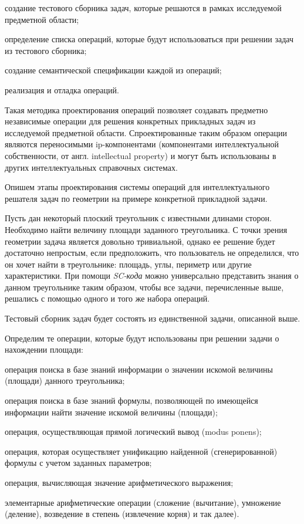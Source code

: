 \begin{textitemize}
	\item создание тестового сборника задач, которые решаются в рамках исследуемой предметной области;
	\item определение списка операций, которые будут использоваться при решении задач из тестового сборника;
	\item создание семантической спецификации каждой из операций;
	\item реализация и отладка операций.
\end{textitemize}

Такая методика проектирования операций позволяет создавать предметно независимые операции для решения конкретных прикладных задач из исследуемой предметной области. Спроектированные таким образом операции являются переносимыми ip-компонентами (компонентами интеллектуальной собственности, от англ. intellectual property) и могут быть использованы в других интеллектуальных справочных системах.

Опишем этапы проектирования системы операций для интеллектуального решателя задач по геометрии на примере конкретной прикладной задачи.

Пусть дан некоторый плоский треугольник с известными длинами сторон. Необходимо найти величину площади заданного треугольника. С точки зрения геометрии задача является довольно тривиальной, однако ее решение будет достаточно непростым, если предположить, что пользователь не определился, что он хочет найти в треугольнике: площадь, углы, периметр или другие характеристики. При помощи \textit{SC-кода} можно универсально представить знания о данном треугольнике таким образом, чтобы все задачи, перечисленные выше, решались с помощью одного и того же набора операций.

Тестовый сборник задач будет состоять из единственной задачи, описанной выше.

Определим те операции, которые будут использованы при решении задачи о нахождении площади:

\begin{textitemize}
	\item операция поиска в базе знаний информации о значении искомой величины (площади) данного треугольника;
	\item операция поиска в базе знаний формулы, позволяющей по имеющейся информации найти значение искомой величины (площади);
	\item операция, осуществляющая прямой логический вывод (modus ponens);
	\item операция, которая осуществляет унификацию найденной (сгенерированной) формулы с учетом заданных параметров;
	\item операция, вычисляющая значение арифметического выражения;
	\item элементарные арифметические операции (сложение (вычитание), умножение (деление), возведение в степень (извлечение корня) и так далее).
\end{textitemize}

